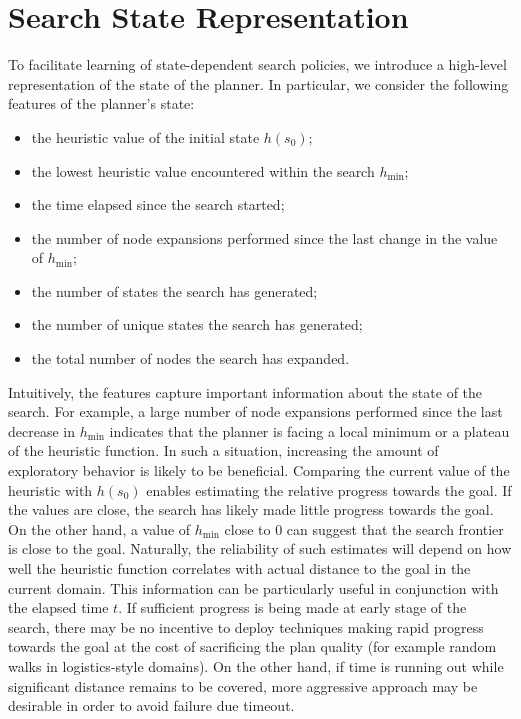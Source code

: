 \documentclass[letterpaper]{article} %
\begin{document}
\section{Search State Representation} \label{sec:representation}

To facilitate learning of state-dependent search policies, we introduce a high-level representation of the state of the planner. In particular, we consider the following features of the planner's state:
\begin{itemize}
    \item the heuristic value of the initial state $h(s_0)$;
    \item the lowest heuristic value encountered within the search $h_{\mathrm{min}}$;
    \item the time elapsed since the search started;
    \item the number of node expansions performed since the last change in the value of $h_{\mathrm{min}}$;
    \item the number of states the search has generated;
    \item the number of unique states the search has generated;
    \item the total number of nodes the search has expanded.
\end{itemize}
Intuitively, the features capture important information about the state of the search. For example, a large number of node expansions performed since the last decrease in $h_{\mathrm{min}}$ indicates that the planner is facing a local minimum or a plateau of the heuristic function. In such a situation, increasing the amount of exploratory behavior is likely to be beneficial. Comparing the current value of the heuristic with $h(s_0)$ enables estimating the relative progress towards the goal. If the values are close, the search has likely made little progress towards the goal. On the other hand, a value of $h_{\mathrm{min}}$ close to 0 can suggest that the search frontier is close to the goal. Naturally, the reliability of such estimates will depend on how well the heuristic function correlates with actual distance to the goal in the current domain. This information can be particularly useful in conjunction with the elapsed time $t$. If sufficient progress is being made at early stage of the search, there may be no incentive to deploy techniques making rapid progress towards the goal at the cost of sacrificing the plan quality (for example random walks in logistics-style domains). On the other hand, if time is running out while significant distance remains to be covered, more aggressive approach may be desirable in order to avoid failure due timeout.
\end{document}
